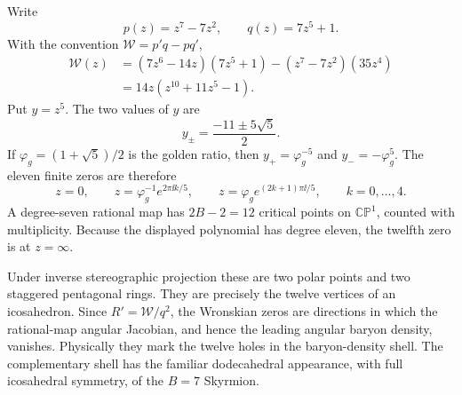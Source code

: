 \begin{enumerate}
  Write
  \[
    p(z)=z^7-7z^2,\qquad q(z)=7z^5+1.
  \]
  With the convention \(\mathcal W=p'q-pq'\),
  \[
  \begin{split}
    \mathcal W(z)
      &=(7z^6-14z)(7z^5+1)
        -(z^7-7z^2)(35z^4)\\
      &=\boxed{14z(z^{10}+11z^5-1).}
  \end{split}
  \]
  Put \(y=z^5\).  The two values of \(y\) are
  \[
    y_\pm=\frac{-11\pm5\sqrt5}{2}.
  \]
  If \(\varphi_g=(1+\sqrt5)/2\) is the golden ratio, then
  \(y_+=\varphi_g^{-5}\) and \(y_-=-\varphi_g^5\).  The eleven finite
  zeros are therefore
  \[
    \boxed{z=0,\qquad
      z=\varphi_g^{-1}e^{2\pi \ii k/5},\qquad
      z=\varphi_g e^{(2k+1)\pi \ii/5},\qquad k=0,\ldots,4.}
  \]
  A degree-seven rational map has \(2B-2=12\) critical points on
  \(\mathbb{CP}^1\), counted with multiplicity.  Because the displayed
  polynomial has degree eleven, the twelfth zero is at
  \(z=\infty\).

  \begin{center}
  \end{center}

  Under inverse stereographic projection these are two polar points and
  two staggered pentagonal rings.  They are precisely the twelve vertices
  of an icosahedron.  Since
  \(R'=\mathcal W/q^2\), the Wronskian zeros are directions in which the
  rational-map angular Jacobian, and hence the leading angular baryon
  density, vanishes.  Physically they mark the twelve holes in the
  baryon-density shell.  The complementary shell has the familiar
  dodecahedral appearance, with full icosahedral symmetry, of the
  \(B=7\) Skyrmion.

\end{enumerate}
